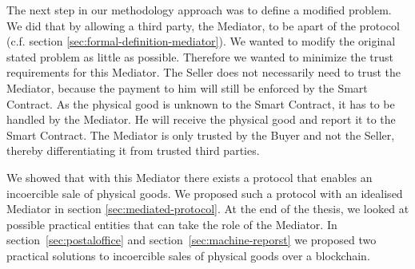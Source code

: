 \documentclass{cacthesis}
\begin{document}
  The next step in our methodology approach was to define a modified problem. We did that by allowing a third party, the Mediator, to be apart of the protocol (c.f. section \ref{sec:formal-definition-mediator}). We wanted to modify the original stated problem as little as possible. Therefore we wanted to minimize the trust requirements for this Mediator. The Seller does not necessarily need to trust the Mediator, because the payment to him will still be enforced by the Smart Contract. As the physical good is unknown to the Smart Contract, it has to be handled by the Mediator. He will receive the physical good and report it to the Smart Contract. The Mediator is only trusted by the Buyer and not the Seller, thereby differentiating it from trusted third parties.\newline
  
  We showed that with this Mediator there exists a protocol that enables an incoercible sale of physical goods. We proposed such a protocol with an idealised Mediator in section \ref{sec:mediated-protocol}. At the end of the thesis, we looked at possible practical entities that can take the role of the Mediator. In section~\ref{sec:postaloffice} and section~\ref{sec:machine-reporst} we proposed two practical solutions to incoercible sales of physical goods over a blockchain. 
  



\end{document}
